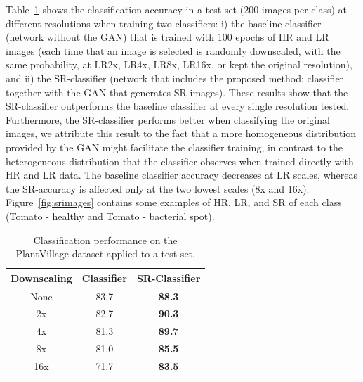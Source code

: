 \documentclass[10pt,twocolumn,letterpaper]{article}
\begin{document}
Table~\ref{tab:results} shows the classification accuracy in a test set (200 images per class) at different resolutions when training two classifiers: i) the baseline classifier (network without the GAN) that is trained with 100 epochs of HR and LR images (each time that an image is selected is randomly downscaled, with the same probability, at LR2x, LR4x, LR8x, LR16x, or kept the original resolution), and ii) the SR-classifier (network that includes the proposed method: classifier together with the GAN that generates SR images). These results show that the SR-classifier outperforms the baseline classifier at every single resolution tested. Furthermore, the SR-classifier performs better when classifying the original images, we attribute this result to the fact that a more homogeneous distribution provided by the GAN might facilitate the classifier training, in contrast to the heterogeneous distribution that the classifier observes when trained directly with HR and LR data. The baseline classifier accuracy decreases at LR scales, whereas the SR-accuracy is affected only at the two lowest scales (8x and 16x). Figure~\ref{fig:srimages} contains some examples of HR, LR, and SR of each class (Tomato - healthy and Tomato - bacterial spot).

\begin{table}[h]
\caption{Classification performance on the PlantVillage dataset applied to a test set.}
\label{tab:results}
\centering
\begin{tabular}{|c|c|c|}
\hline
  Downscaling & Classifier & SR-Classifier \\
\hline
\hline
None & 83.7 & \textbf{88.3} \\
2x & 82.7 & \textbf{90.3} \\
4x & 81.3 & \textbf{89.7} \\
8x & 81.0 & \textbf{85.5} \\
16x & 71.7 & \textbf{83.5} \\
\hline
\end{tabular}
\end{table}
\end{document}
